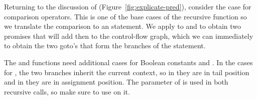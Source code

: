 \documentclass[11pt]{book}
\begin{document}
Returning to the discussion of 
(Figure~\ref{fig:explicate-pred}), consider the case for comparison
operators. This is one of the base cases of the recursive function so
we translate the comparison to an  statement. We apply
 to  and  to obtain two promises
that will add then to the control-flow graph, which we can immediately
 to obtain the two goto's that form the branches of the
 statement.


The  and  functions need
additional cases for Boolean constants and .
%
In the cases for , the two branches inherit the current
context, so in  they are in tail position and in
 they are in assignment position. The
 parameter of  is used in both
recursive calls, so make sure to use  on it.

\end{document}
